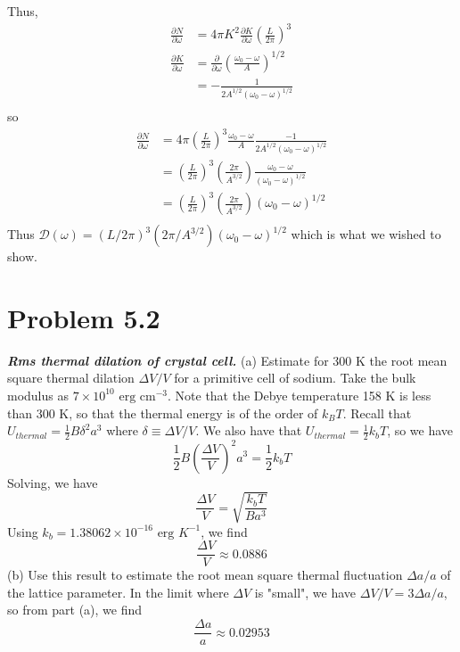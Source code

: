 \documentclass{article}
\begin{document}
Thus,
\begin{align*}
    \frac{\partial N}{\partial \omega} &= 4\pi K^2\frac{\partial K}{\partial \omega}\left(\frac{L}{2\pi}\right)^3 \\
    \frac{\partial K}{\partial \omega} &= \frac{\partial}{\partial \omega} \left(\frac{\omega_0 - \omega}{A}\right)^{1/2} \\
    &= -\frac{1}{2A^{1/2}(\omega_0 - \omega)^{1/2}} \\
\end{align*}
so 
\begin{align*}
    \frac{\partial N}{\partial \omega} &= 4\pi\left(\frac{L}{2\pi}\right)^3\frac{\omega_0 - \omega}{A}\frac{-1}{2A^{1/2}(\omega_0 - \omega)^{1/2}} \\
    &= \left(\frac{L}{2\pi}\right)^3\left(\frac{2\pi}{A^{3/2}}\right)\frac{\omega_0 - \omega}{(\omega_0 - \omega)^{1/2}} \\
    &= \left(\frac{L}{2\pi}\right)^3\left(\frac{2\pi}{A^{3/2}}\right)(\omega_0 -\omega)^{1/2} \\
\end{align*}
Thus $\mathcal{D}(\omega) = (L/2\pi)^3(2\pi/A^{3/2})(\omega_0 - \omega)^{1/2}$ which is what we wished to show.
\newline\newline

\section*{Problem 5.2} \textbf{\textit{Rms thermal dilation of crystal cell.}} (a) Estimate for 300 K the root mean square thermal dilation $\Delta V/V$ for a primitive cell of sodium. Take the bulk modulus as $7 \times 10^{10} \text{ erg cm}^{-3}$. Note that the Debye temperature 158 K is less than 300 K, so that the thermal energy is of the order of $k_BT$. 
\newline\newline
Recall that $U_{thermal} = \frac{1}{2}B\delta^2a^3$ where $\delta \equiv \Delta V/V$. We also have that $U_{thermal} = \frac{1}{2}k_bT$, so we have
\[\frac{1}{2}B\left(\frac{\Delta V}{V}\right)^2a^3 = \frac{1}{2}k_bT\]
Solving, we have
\[\frac{\Delta V}{V} = \sqrt{\frac{k_bT}{Ba^3}}\]
Using $k_b = 1.38062 \times 10^{-16} \text{ erg }K^{-1}$, we find
\[\frac{\Delta V}{V} \approx 0.0886\]
\newline\newline
(b) Use this result to estimate the root mean square thermal fluctuation $\Delta a/a$ of the lattice parameter.
\newline\newline
In the limit where $\Delta V$ is "small", we have $\Delta V/V = 3\Delta a/a$, so from part (a), we find
\[\frac{\Delta a}{a} \approx 0.02953\]
\end{document}
